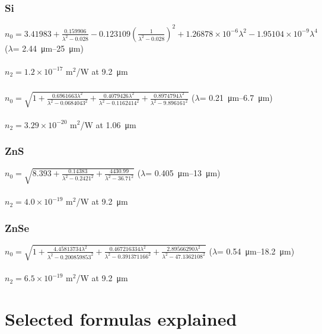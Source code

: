 \documentclass{report}
\begin{document}
\begin{appendices}
\subsection*{Si}
$n_0=3.41983+\frac{0.159906}{\lambda^2-0.028}-0.123109\left(\frac{1}{\lambda^2-0.028}\right)^2+1.26878\times 10^{-6}\lambda^2-1.95104\times 10^{-9}\lambda^4$ (\(\lambda\)= \SIrange{2.44}{25}{\micro\meter}) \cite{Edwards-1980}\\
\\
$n_2 = 1.2\times 10^{-17}$ m$^2$/W at \SI{9.2}{\micro\meter} \cite{Polyanskiy-2023}

\subsection*{}
$n_0=\sqrt{1+\frac{0.6961663\lambda^2}{\lambda^2-0.0684043^2}+\frac{0.4079426\lambda^2}{\lambda^2-0.1162414^2}+\frac{0.8974794\lambda^2}{\lambda^2-9.896161^2}}$ (\(\lambda\)= \SIrange{0.21}{6.7}{\micro\meter}) \cite{Malitson-1965}\\
\\
$n_2 = 3.29\times 10^{-20}$ m$^2$/W at \SI{1.06}{\micro\meter} \cite{Sheik-Bahae-1991}

\subsection*{ZnS}
$n_0=\sqrt{8.393+\frac{0.14383}{\lambda^2-0.2421^{2}}+\frac{4430.99}{\lambda^2-36.71^{2}}}$ (\(\lambda\)= \SIrange{0.405}{13}{\micro\meter}) \cite{Klein-1986}\\
\\
$n_2 = 4.0\times 10^{-19}$ m$^2$/W at \SI{9.2}{\micro\meter} \cite{Polyanskiy-2023}

\subsection*{ZnSe}
$n_0=\sqrt{1+\frac{4.45813734\lambda^2}{\lambda^2-0.200859853^2}+\frac{0.467216334\lambda^2}{\lambda^2-0.391371166^2}+\frac{2.89566290\lambda^2}{\lambda^2-47.1362108^2}}$ (\(\lambda\)= \SIrange{0.54}{18.2}{\micro\meter}) \cite{Tatian-1984}\\
\\
$n_2 = 6.5\times 10^{-19}$ m$^2$/W at \SI{9.2}{\micro\meter} \cite{Polyanskiy-2023}



\chapter{Selected formulas explained}
\label{appendix:formulas_explained}



\end{appendices}
\end{document}
